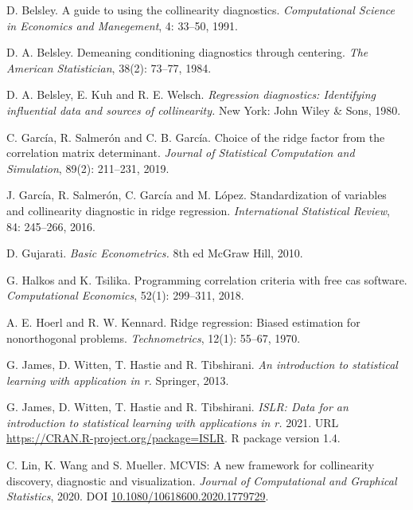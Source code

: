 \hypertarget{refs}{}
\begin{CSLReferences}{1}{0}
\leavevmode{}%
D. Belsley. A guide to using the collinearity diagnostics. \emph{Computational Science in Economics and Manegement}, 4: 33--50, 1991.

\leavevmode{}%
D. A. Belsley. Demeaning conditioning diagnostics through centering. \emph{The American Statistician}, 38(2): 73--77, 1984.

\leavevmode{}%
D. A. Belsley, E. Kuh and R. E. Welsch. \emph{{Regression diagnostics: Identifying influential data and sources of collinearity}.} New York: John Wiley \& Sons, 1980.

\leavevmode{}%
C. García, R. Salmerón and C. B. García. Choice of the ridge factor from the correlation matrix determinant. \emph{Journal of Statistical Computation and Simulation}, 89(2): 211--231, 2019.

\leavevmode{}%
J. García, R. Salmerón, C. García and M. López. Standardization of variables and collinearity diagnostic in ridge regression. \emph{International Statistical Review}, 84: 245--266, 2016.

\leavevmode{}%
D. Gujarati. \emph{{Basic Econometrics}.} 8th ed McGraw Hill, 2010.

\leavevmode{}%
G. Halkos and K. Tsilika. Programming correlation criteria with free cas software. \emph{Computational Economics}, 52(1): 299--311, 2018.

\leavevmode{}%
A. E. Hoerl and R. W. Kennard. Ridge regression: Biased estimation for nonorthogonal problems. \emph{Technometrics}, 12(1): 55--67, 1970.

\leavevmode{}%
G. James, D. Witten, T. Hastie and R. Tibshirani. \emph{An introduction to statistical learning with application in r.} Springer, 2013.

\leavevmode{}%
G. James, D. Witten, T. Hastie and R. Tibshirani. \emph{ISLR: Data for an introduction to statistical learning with applications in r.} 2021. URL \url{https://CRAN.R-project.org/package=ISLR}. R package version 1.4.

\leavevmode{}%
C. Lin, K. Wang and S. Mueller. MCVIS: A new framework for collinearity discovery, diagnostic and visualization. \emph{Journal of Computational and Graphical Statistics}, 2020. DOI \href{https://doi.org/10.1080/10618600.2020.1779729}{10.1080/10618600.2020.1779729}.


\end{CSLReferences}
